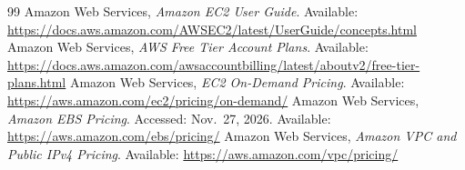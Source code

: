 \begin{thebibliography}{99}
 Amazon Web Services, \emph{Amazon EC2 User Guide}. Available: \url{https://docs.aws.amazon.com/AWSEC2/latest/UserGuide/concepts.html}
 Amazon Web Services, \emph{AWS Free Tier Account Plans}. Available: \url{https://docs.aws.amazon.com/awsaccountbilling/latest/aboutv2/free-tier-plans.html}
 Amazon Web Services, \emph{EC2 On-Demand Pricing}. Available: \url{https://aws.amazon.com/ec2/pricing/on-demand/}
 Amazon Web Services, \emph{Amazon EBS Pricing}. Accessed: Nov.~27, 2026. Available: \url{https://aws.amazon.com/ebs/pricing/}
 Amazon Web Services, \emph{Amazon VPC and Public IPv4 Pricing}. Available: \url{https://aws.amazon.com/vpc/pricing/}
\end{thebibliography}
